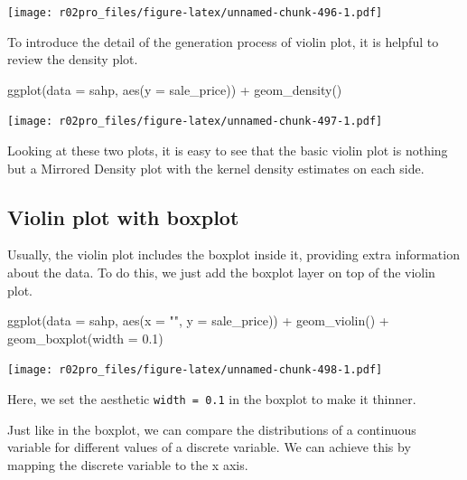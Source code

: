\documentclass[
]{book}
\newenvironment{Shaded}{\begin{snugshade}}{\end{snugshade}}
\newcommand{\AttributeTok}[1]{\textcolor[rgb]{0.77,0.63,0.00}{#1}}
\newcommand{\FloatTok}[1]{\textcolor[rgb]{0.00,0.00,0.81}{#1}}
\newcommand{\FunctionTok}[1]{\textcolor[rgb]{0.00,0.00,0.00}{#1}}
\newcommand{\NormalTok}[1]{#1}
\newcommand{\SpecialCharTok}[1]{\textcolor[rgb]{0.00,0.00,0.00}{#1}}
\newcommand{\StringTok}[1]{\textcolor[rgb]{0.31,0.60,0.02}{#1}}
\begin{document}
\texttt{[image: r02pro\_files/figure-latex/unnamed-chunk-496-1.pdf]}

To introduce the detail of the generation process of violin plot, it is helpful to review the density plot.

\begin{Shaded}
\begin{Highlighting}[]
\FunctionTok{ggplot}\NormalTok{(}\AttributeTok{data =}\NormalTok{ sahp, }\FunctionTok{aes}\NormalTok{(}\AttributeTok{y =}\NormalTok{ sale\_price)) }\SpecialCharTok{+} \FunctionTok{geom\_density}\NormalTok{()}
\end{Highlighting}
\end{Shaded}

\texttt{[image: r02pro\_files/figure-latex/unnamed-chunk-497-1.pdf]}

Looking at these two plots, it is easy to see that the basic violin plot is nothing but a Mirrored Density plot with the kernel density estimates on each side.

\hypertarget{violin-plot-with-boxplot}{%
\subsection{Violin plot with boxplot}\label{violin-plot-with-boxplot}}

Usually, the violin plot includes the boxplot inside it, providing extra information about the data. To do this, we just add the boxplot layer on top of the violin plot.

\begin{Shaded}
\begin{Highlighting}[]
\FunctionTok{ggplot}\NormalTok{(}\AttributeTok{data =}\NormalTok{ sahp, }\FunctionTok{aes}\NormalTok{(}\AttributeTok{x =} \StringTok{""}\NormalTok{, }\AttributeTok{y =}\NormalTok{ sale\_price)) }\SpecialCharTok{+} 
  \FunctionTok{geom\_violin}\NormalTok{() }\SpecialCharTok{+}
  \FunctionTok{geom\_boxplot}\NormalTok{(}\AttributeTok{width =} \FloatTok{0.1}\NormalTok{)}
\end{Highlighting}
\end{Shaded}

\texttt{[image: r02pro\_files/figure-latex/unnamed-chunk-498-1.pdf]}

Here, we set the aesthetic \texttt{width\ =\ 0.1} in the boxplot to make it thinner.

Just like in the boxplot, we can compare the distributions of a continuous variable for different values of a discrete variable. We can achieve this by mapping the discrete variable to the x axis.
\end{document}
